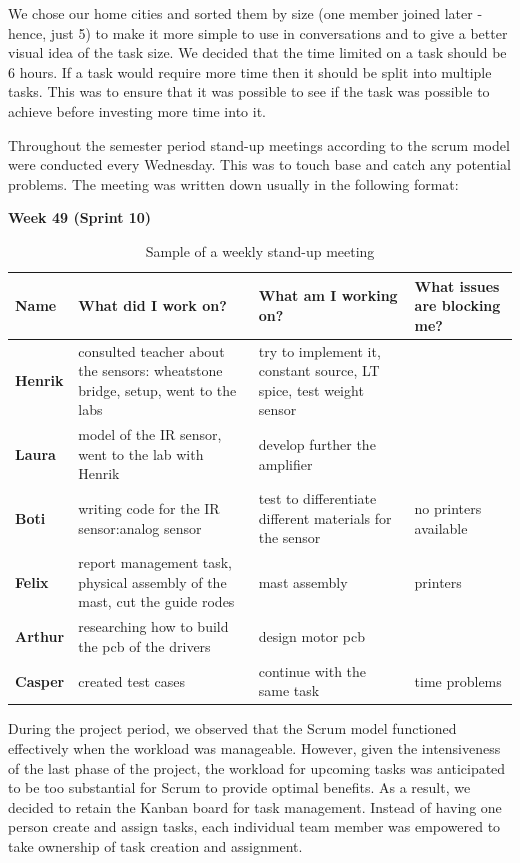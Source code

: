\documentclass[../report.tex]{subfiles}
\begin{document}
We chose our home cities and sorted them by size (one member joined later - hence, just 5) to make it more simple to use
in conversations and to give a better visual idea of the task size. We decided
that the time limited on a task should be 6 hours. If a task would require more
time then it should be split into multiple tasks. This was to ensure that it
was possible to see if the task was possible to achieve before investing more
time into it.

Throughout the semester period stand-up meetings according to the scrum model
were conducted every Wednesday. This was to touch base and catch any potential
problems. The meeting was written down usually in the following format:

\textbf{Week 49 (Sprint 10)}
\begin{table}[H]
    \begin{center}
        \begin{tabularx}{\linewidth}{L|L|L|L}
            
            \textbf{Name} & \textbf{What did I work on?} & \textbf{What am I working on? }& \textbf{What issues are blocking me?} \\
            \hline
            \textbf{Henrik} & consulted teacher about the sensors: wheatstone bridge, setup, went to the labs & try to implement it, constant source, LT spice, test weight sensor &  \\
            \hline
            \textbf{Laura} & model of the IR sensor, went to the lab with Henrik & develop further the amplifier  & \\
            \hline
            \textbf{Boti} & writing code for the IR sensor:analog sensor & test to differentiate different materials for the sensor & no printers available\\
            \hline
            \textbf{Felix} & report management task, physical assembly of the mast, cut the guide rodes & mast assembly & printers \\
            \hline
            \textbf{Arthur} & researching how to build the pcb of the drivers & design motor pcb & \\
            \hline
            \textbf{Casper} & created test cases & continue with the same task & time problems
        \end{tabularx}
    \end{center}
    \caption{Sample of a weekly stand-up meeting}
\end{table}

During the project period, we observed that the Scrum model functioned
effectively when the workload was manageable. However, given the intensiveness
of the last phase of the project, the workload for upcoming tasks was
anticipated to be too substantial for Scrum to provide optimal benefits. As a
result, we decided to retain the Kanban board for task management. Instead of
having one person create and assign tasks, each individual team member was
empowered to take ownership of task creation and assignment.
\end{document}
